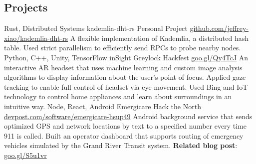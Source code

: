 \documentclass{resume}
\begin{document}
\begin{main}
    \section{Projects}
      \begin{entrylist}
        \rightentry%
          {Rust, Distributed Systems}%
          {kademlia-dht-rs}%
          {Personal Project}%
          {\href{https://github.com/jeffrey-xiao/kademlia-dht-rs}{github.com/jeffrey-xiao/kademlia-dht-rs}}%
          {\createlist%
            {%
              A flexible implementation of Kademlia, a distributed hash table. %
            }%
            {%
              Used strict parallelism to efficiently send RPCs to probe nearby nodes. %
            }%
          }
        \rightentry%
          {Python, C++, Unity, TensorFlow}%
          {inSight}%
          {Greylock Hackfest}%
          {\href{https://goo.gl/Qy4TcJ}{goo.gl/Qy4TcJ}}%
          {\createlist%
            {%
              An interactive AR headset that uses machine learning and custom image %
              analysis algorithms to display information about the user's point of focus. %
            }%
            {%
              Applied gaze tracking to enable full control of headset via eye movement. %
            }%
            {%
              Used Bing and IoT technology to control home appliances and learn about surroundings %
              in an intuitive way. %
            }%
          }
        \rightentry%
          {Node, React, Android}%
          {Emergicare}%
          {Hack the North}%
          {\href{https://devpost.com/software/emergicare-hsup49}{devpost.com/software/emergicare-hsup49}}%
          {\createlist%
            {%
              Android background service that sends optimized GPS and network locations by text to %
              a specified number every time 911 is called. %
            }%
            {%
              Built an operator dashboard that supports routing of emergency vehicles simulated by %
              the Grand River Transit system. %
            }%
            {%
              \textbf{Related blog post}: \color{lightred}\href{https://goo.gl/S5u1vr}{goo.gl/S5u1vr}%
            }%
          }
      \end{entrylist}
  \end{main}
\end{document}
